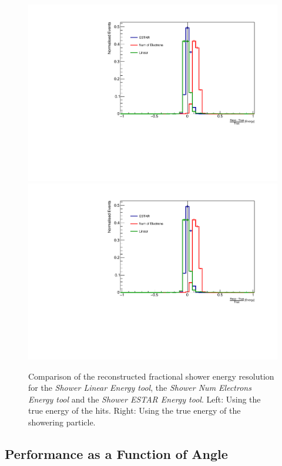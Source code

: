 \begin{figure}[h!]
    \centering
    \includegraphics[width = \largefigwidth]{figures-chap4/bias_cheat_plane_2_all.pdf}
    \includegraphics[width = \largefigwidth]{figures-chap4/bias_cheat_plane_2_all.pdf}
    \caption[Comparison of the reconstructed fractional shower energy resolution.]{Comparison of the reconstructed fractional shower energy resolution for the \textit{Shower Linear Energy tool}, the \textit{Shower Num Electrons Energy tool} and the \textit{Shower ESTAR Energy tool}. Left: Using the true energy of the hits. Right: Using the true energy of the showering particle.}
    \label{fig:fractional_energy_resolution_hit_level}
\end{figure}

\clearpage
\subsection{Performance as a Function of Angle}

